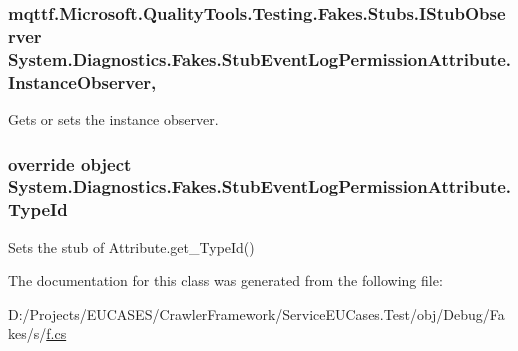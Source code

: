 \hypertarget{class_system_1_1_diagnostics_1_1_fakes_1_1_stub_event_log_permission_attribute_a869891ba8c29475036eec573f10782bd}{
\subsubsection[{Instance\-Observer}]{\setlength{\rightskip}{0pt plus 5cm}mqttf.\-Microsoft.\-Quality\-Tools.\-Testing.\-Fakes.\-Stubs.\-I\-Stub\-Observer System.\-Diagnostics.\-Fakes.\-Stub\-Event\-Log\-Permission\-Attribute.\-Instance\-Observer\hspace{0.3cm}{\ttfamily [get]}, {\ttfamily [set]}}}\label{class_system_1_1_diagnostics_1_1_fakes_1_1_stub_event_log_permission_attribute_a869891ba8c29475036eec573f10782bd}


Gets or sets the instance observer.

\hypertarget{class_system_1_1_diagnostics_1_1_fakes_1_1_stub_event_log_permission_attribute_a4c1e292d5299b6f887dc19d80de9c3c4}{
\subsubsection[{Type\-Id}]{\setlength{\rightskip}{0pt plus 5cm}override object System.\-Diagnostics.\-Fakes.\-Stub\-Event\-Log\-Permission\-Attribute.\-Type\-Id\hspace{0.3cm}{\ttfamily [get]}}}\label{class_system_1_1_diagnostics_1_1_fakes_1_1_stub_event_log_permission_attribute_a4c1e292d5299b6f887dc19d80de9c3c4}


Sets the stub of Attribute.\-get\-\_\-\-Type\-Id()



The documentation for this class was generated from the following file\-:\begin{DoxyCompactItemize}
\item 
D\-:/\-Projects/\-E\-U\-C\-A\-S\-E\-S/\-Crawler\-Framework/\-Service\-E\-U\-Cases.\-Test/obj/\-Debug/\-Fakes/s/\hyperlink{s_2f_8cs}{f.\-cs}\end{DoxyCompactItemize}
